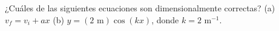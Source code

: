 \item ¿Cuáles de las siguientes ecuaciones son dimensionalmente correctas? (a) $v_f = v_i + ax$ (b) $y = (2 \text{ m}) \cos(kx)$, donde $k = 2 \text{ m}^{-1}$.
